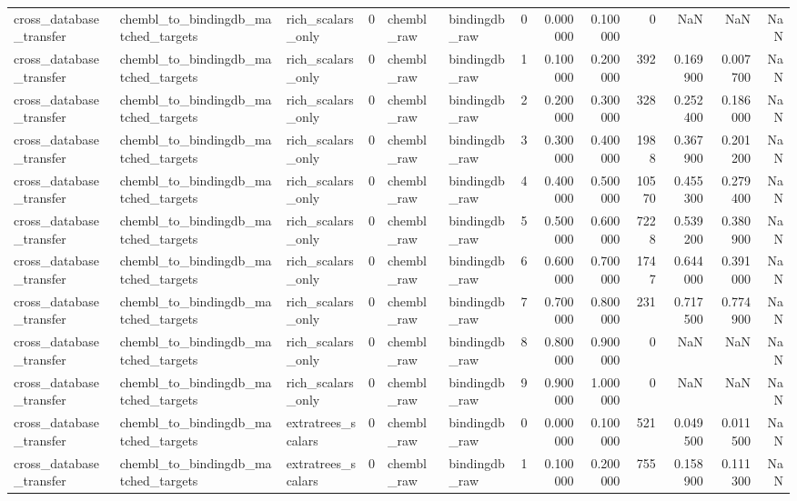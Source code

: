 \begin{longtable}{lllrllrrrrrrr}
cross\_database\_transfer & chembl\_to\_bindingdb\_matched\_targets & rich\_scalars\_only & 0 & chembl\_raw & bindingdb\_raw & 0 & 0.000000 & 0.100000 & 0 & NaN & NaN & NaN \\
cross\_database\_transfer & chembl\_to\_bindingdb\_matched\_targets & rich\_scalars\_only & 0 & chembl\_raw & bindingdb\_raw & 1 & 0.100000 & 0.200000 & 392 & 0.169900 & 0.007700 & NaN \\
cross\_database\_transfer & chembl\_to\_bindingdb\_matched\_targets & rich\_scalars\_only & 0 & chembl\_raw & bindingdb\_raw & 2 & 0.200000 & 0.300000 & 328 & 0.252400 & 0.186000 & NaN \\
cross\_database\_transfer & chembl\_to\_bindingdb\_matched\_targets & rich\_scalars\_only & 0 & chembl\_raw & bindingdb\_raw & 3 & 0.300000 & 0.400000 & 1988 & 0.367900 & 0.201200 & NaN \\
cross\_database\_transfer & chembl\_to\_bindingdb\_matched\_targets & rich\_scalars\_only & 0 & chembl\_raw & bindingdb\_raw & 4 & 0.400000 & 0.500000 & 10570 & 0.455300 & 0.279400 & NaN \\
cross\_database\_transfer & chembl\_to\_bindingdb\_matched\_targets & rich\_scalars\_only & 0 & chembl\_raw & bindingdb\_raw & 5 & 0.500000 & 0.600000 & 7228 & 0.539200 & 0.380900 & NaN \\
cross\_database\_transfer & chembl\_to\_bindingdb\_matched\_targets & rich\_scalars\_only & 0 & chembl\_raw & bindingdb\_raw & 6 & 0.600000 & 0.700000 & 1747 & 0.644000 & 0.391000 & NaN \\
cross\_database\_transfer & chembl\_to\_bindingdb\_matched\_targets & rich\_scalars\_only & 0 & chembl\_raw & bindingdb\_raw & 7 & 0.700000 & 0.800000 & 231 & 0.717500 & 0.774900 & NaN \\
cross\_database\_transfer & chembl\_to\_bindingdb\_matched\_targets & rich\_scalars\_only & 0 & chembl\_raw & bindingdb\_raw & 8 & 0.800000 & 0.900000 & 0 & NaN & NaN & NaN \\
cross\_database\_transfer & chembl\_to\_bindingdb\_matched\_targets & rich\_scalars\_only & 0 & chembl\_raw & bindingdb\_raw & 9 & 0.900000 & 1.000000 & 0 & NaN & NaN & NaN \\
cross\_database\_transfer & chembl\_to\_bindingdb\_matched\_targets & extratrees\_scalars & 0 & chembl\_raw & bindingdb\_raw & 0 & 0.000000 & 0.100000 & 521 & 0.049500 & 0.011500 & NaN \\
cross\_database\_transfer & chembl\_to\_bindingdb\_matched\_targets & extratrees\_scalars & 0 & chembl\_raw & bindingdb\_raw & 1 & 0.100000 & 0.200000 & 755 & 0.158900 & 0.111300 & NaN \\

\end{longtable}
